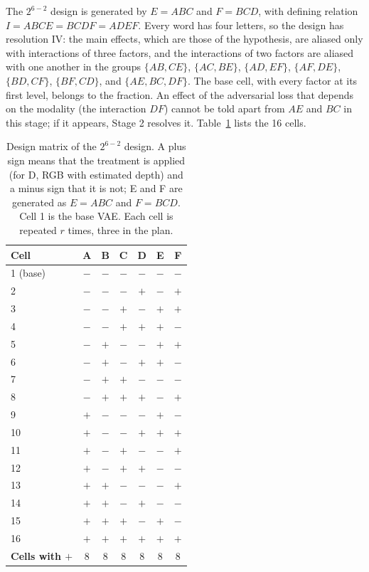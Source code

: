 The $2^{6-2}$ design is generated by $E=ABC$ and $F=BCD$, with defining relation $I=ABCE=BCDF=ADEF$. Every word has four letters, so the design has resolution IV: the main effects, which are those of the hypothesis, are aliased only with interactions of three factors, and the interactions of two factors are aliased with one another in the groups $\{AB,CE\}$, $\{AC,BE\}$, $\{AD,EF\}$, $\{AF,DE\}$, $\{BD,CF\}$, $\{BF,CD\}$, and $\{AE,BC,DF\}$. The base cell, with every factor at its first level, belongs to the fraction. An effect of the adversarial loss that depends on the modality (the interaction $DF$) cannot be told apart from $AE$ and $BC$ in this stage; if it appears, Stage 2 resolves it. Table~\ref{tab:design} lists the 16 cells.

\begin{table}[H]
\centering
\small
\begin{tabular}{lcccccc}
\hline
\textbf{Cell} & \textbf{A} & \textbf{B} & \textbf{C} & \textbf{D} & \textbf{E} & \textbf{F} \\
\hline
1 (base) & $-$ & $-$ & $-$ & $-$ & $-$ & $-$ \\
2 & $-$ & $-$ & $-$ & $+$ & $-$ & $+$ \\
3 & $-$ & $-$ & $+$ & $-$ & $+$ & $+$ \\
4 & $-$ & $-$ & $+$ & $+$ & $+$ & $-$ \\
5 & $-$ & $+$ & $-$ & $-$ & $+$ & $+$ \\
6 & $-$ & $+$ & $-$ & $+$ & $+$ & $-$ \\
7 & $-$ & $+$ & $+$ & $-$ & $-$ & $-$ \\
8 & $-$ & $+$ & $+$ & $+$ & $-$ & $+$ \\
9 & $+$ & $-$ & $-$ & $-$ & $+$ & $-$ \\
10 & $+$ & $-$ & $-$ & $+$ & $+$ & $+$ \\
11 & $+$ & $-$ & $+$ & $-$ & $-$ & $+$ \\
12 & $+$ & $-$ & $+$ & $+$ & $-$ & $-$ \\
13 & $+$ & $+$ & $-$ & $-$ & $-$ & $+$ \\
14 & $+$ & $+$ & $-$ & $+$ & $-$ & $-$ \\
15 & $+$ & $+$ & $+$ & $-$ & $+$ & $-$ \\
16 & $+$ & $+$ & $+$ & $+$ & $+$ & $+$ \\
\hline
\textbf{Cells with $+$} & 8 & 8 & 8 & 8 & 8 & 8 \\
\hline
\end{tabular}
\caption{Design matrix of the $2^{6-2}$ design. A plus sign means that the treatment is applied (for D, RGB with estimated depth) and a minus sign that it is not; E and F are generated as $E=ABC$ and $F=BCD$. Cell 1 is the base VAE. Each cell is repeated $r$ times, three in the plan.}
\label{tab:design}
\end{table}

